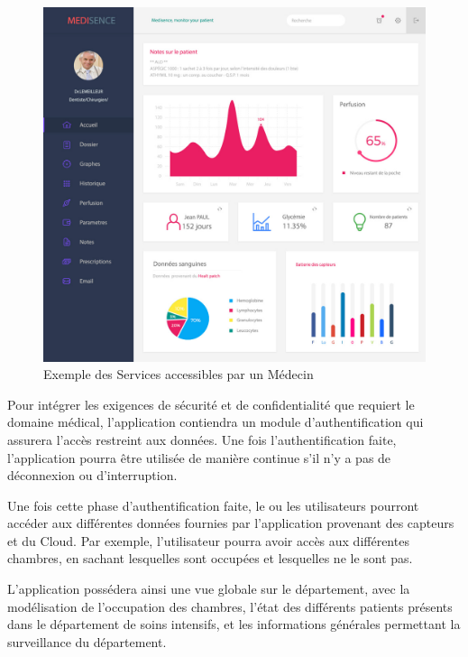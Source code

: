 \begin{figure}[h!]
	\hspace*{-2.5cm}
	\centering
	\includegraphics[width=1.4\textwidth]{exempleApplication.jpg}
	\caption{Exemple des Services accessibles par un Médecin}
	\label{appli2}
\end{figure}

Pour intégrer les exigences de sécurité et de confidentialité que requiert le domaine médical, l’application contiendra un module
d’authentification qui assurera l’accès restreint aux données. Une fois l’authentification faite, l’application pourra être
utilisée de manière continue s’il n’y a pas de déconnexion ou d’interruption.


Une fois cette phase d’authentification faite, le ou les utilisateurs pourront accéder aux différentes données fournies par l’application provenant des capteurs et du Cloud. Par exemple, l’utilisateur pourra avoir accès aux différentes chambres, en sachant lesquelles sont occupées et lesquelles ne le sont pas.


L’application possédera ainsi une vue globale sur le département, avec la modélisation de l’occupation des chambres, l’état des différents patients présents dans le département de soins intensifs, et les informations générales permettant la surveillance du département.

